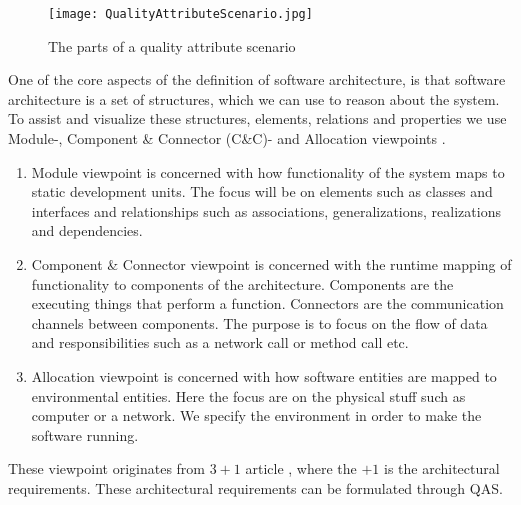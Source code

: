 \begin{figure}[H]
\centering
\texttt{[image: QualityAttributeScenario.jpg]}

\caption{The parts of a quality attribute scenario}
\label{fig:Quality_Attribute_Scenario}
\end{figure}





\noindent
One of the core aspects of the definition of software architecture, is that software architecture is a set of structures, which we can use to reason about the system. To assist and visualize these structures, elements, relations and properties we use Module-, Component \& Connector (C\&C)- and Allocation viewpoints \cite{3+1}. 

\begin{enumerate}
    \item Module viewpoint is concerned with how functionality of the system maps to static development units. The focus will be on elements such as classes and interfaces and relationships such as associations, generalizations, realizations and dependencies.
    \item Component \& Connector viewpoint is concerned with the runtime mapping of functionality to components of the architecture. Components are the executing things that perform a function. Connectors are the communication channels between components. The purpose is to focus on the flow of data and responsibilities such as a network call or method call etc.
    \item Allocation viewpoint is concerned with how software entities are mapped to environmental entities. Here the focus are on the physical stuff such as computer or a network. We specify the environment in order to make the software running. 
\end{enumerate}

\noindent
These viewpoint originates from $3+1$ article \cite{3+1}, where the $+1$ is the architectural requirements. These architectural requirements can be formulated through QAS.


